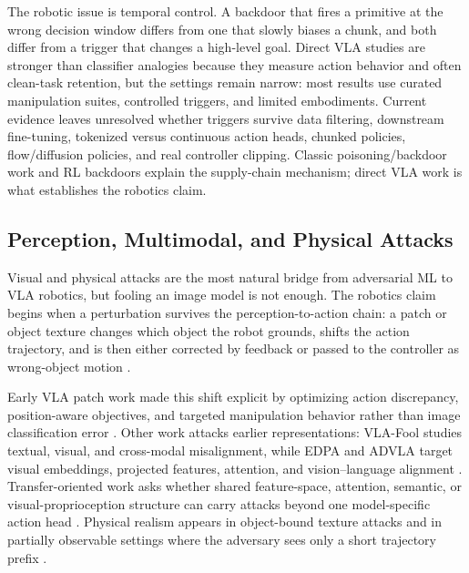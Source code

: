 The robotic issue is temporal control. A backdoor that fires a primitive at the wrong decision window differs from one that slowly biases a chunk, and both differ from a trigger that changes a high-level goal. Direct VLA studies are stronger than classifier analogies because they measure action behavior and often clean-task retention, but the settings remain narrow: most results use curated manipulation suites, controlled triggers, and limited embodiments. Current evidence leaves unresolved whether triggers survive data filtering, downstream fine-tuning, tokenized versus continuous action heads, chunked policies, flow/diffusion policies, and real controller clipping. Classic poisoning/backdoor work \cite{biggio2012poisoning,gu2017badnets,liu2018trojaning,carlini2024poisoningweb} and RL backdoors \cite{kiourti2020trojdrl,wang2021backdoorl,cui2024badrl,rathbun2025inception} explain the supply-chain mechanism; direct VLA work is what establishes the robotics claim.

\subsection{Perception, Multimodal, and Physical Attacks}

Visual and physical attacks are the most natural bridge from adversarial ML to VLA robotics, but fooling an image model is not enough. The robotics claim begins when a perturbation survives the perception-to-action chain: a patch or object texture changes which object the robot grounds, shifts the action trajectory, and is then either corrected by feedback or passed to the controller as wrong-object motion \cite{lin2017tactics,sharif2016accessorize,xie2017segdet,sato2021dirtyroad}.

Early VLA patch work made this shift explicit by optimizing action discrepancy, position-aware objectives, and targeted manipulation behavior rather than image classification error \cite{wang2025vlaadversarial}. Other work attacks earlier representations: VLA-Fool studies textual, visual, and cross-modal misalignment, while EDPA and ADVLA target visual embeddings, projected features, attention, and vision--language alignment \cite{yan2025vlafool,xu2025edpa,zhang2025advla}. Transfer-oriented work asks whether shared feature-space, attention, semantic, or visual-proprioception structure can carry attacks beyond one model-specific action head \cite{lu2026patch,fu2026vlahijack}. Physical realism appears in object-bound texture attacks and in partially observable settings where the adversary sees only a short trajectory prefix \cite{chen2026tex3d,wang2026partialpatch}.

